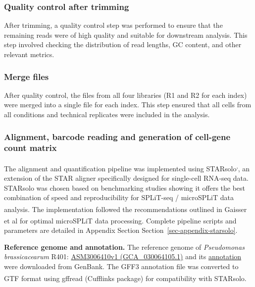 \documentclass[
  11pt,
  a4paper,
]{report}
\begin{document}
\subsubsection{Quality control after
trimming}\label{quality-control-after-trimming}

After trimming, a quality control step was performed to ensure that the
remaining reads were of high quality and suitable for downstream
analysis. This step involved checking the distribution of read lengths,
GC content, and other relevant metrics.

\subsubsection{Merge files}\label{merge-files}

After quality control, the files from all four libraries (R1 and R2 for
each index) were merged into a single file for each index. This step
ensured that all cells from all conditions and technical replicates were
included in the analysis.

\subsubsection{Alignment, barcode reading and generation of cell-gene
count
matrix}\label{alignment-barcode-reading-and-generation-of-cell-gene-count-matrix}

The alignment and quantification pipeline was implemented using
STARsolo\textsuperscript{,},
an extension of the STAR aligner specifically designed for single-cell
RNA-seq data. STARsolo was chosen based on benchmarking studies showing
it offers the best combination of speed and reproducibility for
SPLiT-seq / microSPLiT data
analysis\textsuperscript{}. The
implementation followed the recommendations outlined in Gaisser et
al\textsuperscript{} for optimal
microSPLiT data processing. Complete pipeline scripts and parameters are
detailed in Appendix Section Section~\ref{sec-appendix-starsolo}.

\textbf{Reference genome and annotation.} The reference genome of
\emph{Pseudomonas brassicacearum} R401:
\href{https://www.ncbi.nlm.nih.gov/datasets/genome/GCA_030064105.1/}{ASM3006410v1
(GCA\_030064105.1)} and its
\href{https://www.ncbi.nlm.nih.gov/datasets/gene/GCA_030064105.1/}{annotation}
were downloaded from GenBank. The GFF3 annotation file was converted to
GTF format using gffread
(Cufflinks\textsuperscript{} package) for
compatibility with STARsolo.
\end{document}
